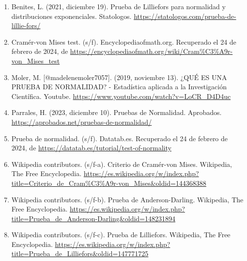 \documentclass{article}
\begin{document}
\begin{enumerate}
    \item Benites, L. (2021, diciembre 19). Prueba de Lilliefors para normalidad y distribuciones exponenciales. Statologos. \url{https://statologos.com/prueba-de-lillie-fors/}
    \item Cramér-von Mises test. (s/f). Encyclopediaofmath.org. Recuperado el 24 de febrero de 2024, de \url{https://encyclopediaofmath.org/wiki/Cram%C3%A9r-von_Mises_test}
    \item Moler, M. [@madelenemoler7057]. (2019, noviembre 13). ¿QUÉ ES UNA PRUEBA DE NORMALIDAD? - Estadística aplicada a la Investigación Científica. Youtube. \url{https://www.youtube.com/watch?v=LoCR_D4D4uc}
    \item Parrales, H. (2023, diciembre 10). Pruebas de Normalidad. Aprobados. \url{https://aprobados.net/pruebas-de-normalidad/}
    \item Prueba de normalidad. (s/f). Datatab.es. Recuperado el 24 de febrero de 2024, de \url{https://datatab.es/tutorial/test-of-normality}
    \item Wikipedia contributors. (s/f-a). Criterio de Cramér-von Mises. Wikipedia, The Free Encyclopedia. \url{https://es.wikipedia.org/w/index.php?title=Criterio_de_Cram%C3%A9r-von_Mises&oldid=144368388}
    \item Wikipedia contributors. (s/f-b). Prueba de Anderson-Darling. Wikipedia, The Free Encyclopedia. \url{https://es.wikipedia.org/w/index.php?title=Prueba_de_Anderson-Darling&oldid=148231894}
    \item Wikipedia contributors. (s/f-c). Prueba de Lilliefors. Wikipedia, The Free Encyclopedia. \url{https://es.wikipedia.org/w/index.php?title=Prueba_de_Lilliefors&oldid=147771725}
\end{enumerate}
\end{document}
